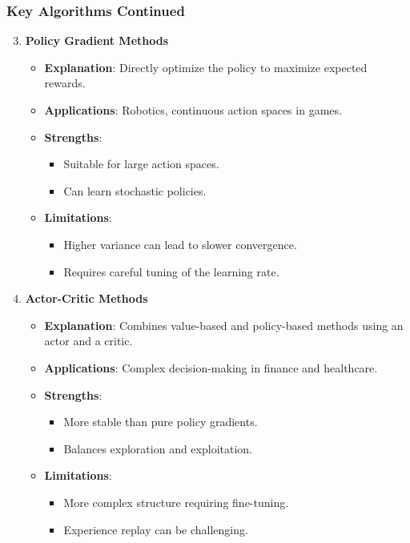 \documentclass[aspectratio=169]{beamer}
\begin{document}
\begin{frame}[fragile]
    \frametitle{Key Algorithms Continued}
    \begin{enumerate}
        \setcounter{enumi}{2} %
        \item \textbf{Policy Gradient Methods}
            \begin{itemize}
                \item \textbf{Explanation}: Directly optimize the policy to maximize expected rewards.
                \item \textbf{Applications}: Robotics, continuous action spaces in games.
                \item \textbf{Strengths}:
                    \begin{itemize}
                        \item Suitable for large action spaces.
                        \item Can learn stochastic policies.
                    \end{itemize}
                \item \textbf{Limitations}:
                    \begin{itemize}
                        \item Higher variance can lead to slower convergence.
                        \item Requires careful tuning of the learning rate.
                    \end{itemize}
            \end{itemize}
        
        \item \textbf{Actor-Critic Methods}
            \begin{itemize}
                \item \textbf{Explanation}: Combines value-based and policy-based methods using an actor and a critic.
                \item \textbf{Applications}: Complex decision-making in finance and healthcare.
                \item \textbf{Strengths}:
                    \begin{itemize}
                        \item More stable than pure policy gradients.
                        \item Balances exploration and exploitation.
                    \end{itemize}
                \item \textbf{Limitations}:
                    \begin{itemize}
                        \item More complex structure requiring fine-tuning.
                        \item Experience replay can be challenging.
                    \end{itemize}
            \end{itemize}
    \end{enumerate}
\end{frame}
\end{document}
